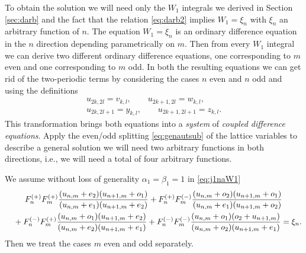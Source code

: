 \documentclass[pdftex]{sigma}
\numberwithin{equation}{section}
\begin{document}
To obtain the solution we will need only the $W_{1}$ integrals we
derived in Section \ref{sec:darb}
and the fact that the relation \eqref{eq:darb2}
implies $W_{1}=\xi_{n}$ with $\xi_{n}$ an arbitrary function of $n$.
The equation $W_{1}=\xi_{n}$ is an
ordinary dif\/ference equation in the $n$ direction depending
parametrically on $m$.
Then from every $W_{1}$ integral we can derive
two dif\/ferent ordinary dif\/ference equations, one
corresponding to $m$ even and one corresponding to $m$ odd.
In both the resulting equations we can get rid of the two-periodic
terms by considering the cases $n$ even and $n$ odd and using the
def\/initions
\begin{subequations} \label{eq:genautsub}
 \begin{gather}
 u_{2k,2l} = v_{k,l}, \qquad u_{2k+1,2l} = w_{k,l}, \label{eq:genautsubl} \\
 u_{2k,2l+1} = y_{k,l}, \qquad u_{2k+1,2l+1} = z_{k,l}. \label{eq:genautsublp}
 \end{gather}
\end{subequations}
This transformation brings both equations into a \emph{system} of \emph{coupled difference equations}.
Apply the even/odd splitting \eqref{eq:genautsub} of the lattice variables to describe a general solution we will need two arbitrary functions in both directions, i.e., we will need a total of four arbitrary functions.

We assume without loss of generality $\alpha_{1}=\beta_{1}=1$ in \eqref{eq:j1naW1}
\begin{gather}
F_n^{(+)}F_m^{(+)}{\frac { ( u_{{n,m}}+e_2 )
 ( u_{{n+1,m}}+o_1) }{ ( u_{{n,m}}+ e_1 )
 ( u_{{n+1,m}}+e_2 ) }}
+F_n^{(+)}F_m^{(-)} {\frac { ( u_{{n,m}}+o_2 )
 ( u_{{n+1,m}}+o_1 ) }{%
 ( u_{{n,m}}+e_1 )
 ( u_{{n+1,m}} +o_{2}) }} \nonumber\\
 \quad {}+F_n^{(-)}F_m^{(+)} {\frac { ( u_{{n,m}}+o_1 )
 ( u_{{n+1,m}}+ e_2 ) }{%
 ( u_{{n,m}}+e_2 )
 ( u_{{n+1,m}}+e_1 ) }}
 +F_n^{(-)}F_m^{(-)} {\frac { ( u_{{n,m}}+o_1 )
 ( o_2+u_{{n+1,m}} ) }{%
 ( u_{{n,m}}+ o_2 ) ( u_{{n+1,m}}+e_1 ) }}=\xi_{n}.
 \label{eq:j1naW1eq}
\end{gather}
Then we treat the cases $m$ even and odd separately.
\end{document}
